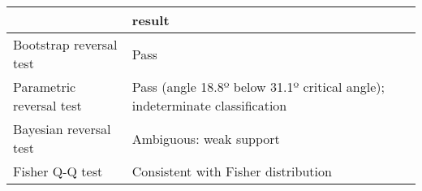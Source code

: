 \begin{tabular}{ll}
\toprule
{} &                                                                       result \\
\midrule
Bootstrap reversal test  &                                                                         Pass \\
Parametric reversal test &  Pass (angle 18.8º below 31.1º critical angle); indeterminate classification \\
Bayesian reversal test   &                                                      Ambiguous: weak support \\
Fisher Q-Q test          &                                          Consistent with Fisher distribution \\
\bottomrule
\end{tabular}

